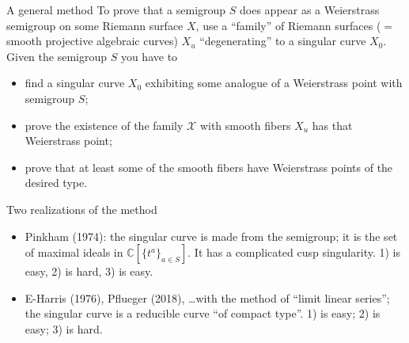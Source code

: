 \documentclass[12pt, aspectratio=169]{beamer}
\def\C{{\mathbb C}}
\begin{document}
\begin{frame}{A general method}
To prove that a semigroup $S$ does appear as a Weierstrass semigroup on some
Riemann surface $X$, use a ``family'' of
Riemann surfaces  ($=$ smooth projective algebraic curves) $X_u$ ``degenerating'' to a singular curve $X_0$.
 Given the semigroup $S$ you
have to
\begin{itemize}
\item find a singular curve $X_0$ exhibiting some analogue of a Weierstrass point with semigroup $S$;
\item prove the existence of the family $\mathcal X$ with smooth fibers $X_u$ has that Weierstrass point;
\item prove that at least some of the smooth fibers have Weierstrass points of the desired type.

\end{itemize}

\end{frame}



\begin{frame}{Two realizations of the method}


\begin{itemize}
 \item Pinkham (1974): the singular curve is made from the semigroup; it is the set 
of maximal ideals in $\C[\{t^a\}_{a\in S}]$. It has a complicated cusp singularity. 1) is easy, 2) is hard, 3) is easy.

\item E-Harris (1976), Pflueger (2018), \dots with the method of ``limit linear series''; the singular curve is a reducible curve ``of compact type''. 1) is easy; 2) is easy; 3) is hard.
\end{itemize}
\end{frame}
\end{document}
